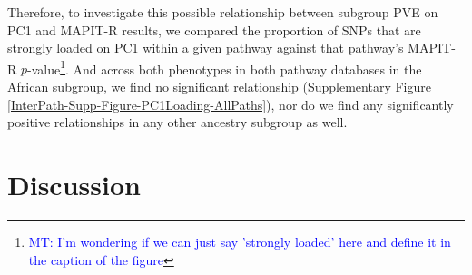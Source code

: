 \documentclass[12pt,a4paper]{article}
\def\log{{\rm log}}
\begin{document}
Therefore, to investigate this possible relationship between subgroup PVE on PC1 and MAPIT-R results, we compared the proportion of SNPs that are strongly loaded on PC1 within a given pathway against that pathway's MAPIT-R $p$-value\footnote{\textcolor{blue}{MT: I'm wondering if we can just say 'strongly loaded' here and define it in the caption of the figure}}. And across both phenotypes in both pathway databases in the African subgroup, we find no significant relationship (Supplementary Figure \ref{InterPath-Supp-Figure-PC1Loading-AllPaths}), nor do we find any significantly positive relationships in any other ancestry subgroup as well. 











\section{Discussion}\label{InterPath-Discussion}
\end{document}
